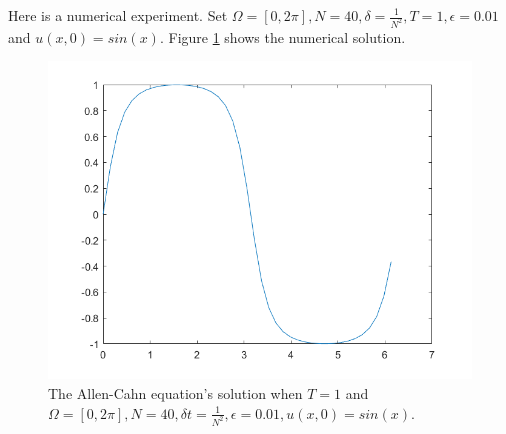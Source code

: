 \documentclass[a4paper]{article}
\begin{document}
Here is a numerical experiment. Set $\Omega = [0,2\pi], N = 40, \delta=\frac{1}{N^2}, T=1, \epsilon=0.01$ and $u(x,0)=sin(x)$.
Figure \ref{im::1D_Allen_Cahn}  shows the numerical solution.
\begin{figure}[h]
    \centering
    \includegraphics[scale=0.5]{allen_cahn.png}
    \caption{The Allen-Cahn equation's solution when $T=1$ and $\Omega = [0,2\pi], N = 40, \delta t=\frac{1}{N^2}, \epsilon=0.01, u(x,0)=sin(x)$.}
    \label{im::1D_Allen_Cahn}
\end{figure}
\end{document}
